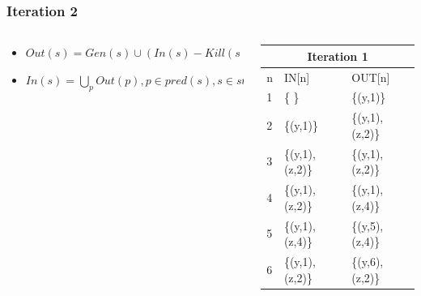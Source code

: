 \begin{frame}[fragile, t]
	\frametitle{Iteration 2} 
	
	\vspace{-1cm}
	
	\begin{columns}[T]
		\begin{column}[T]{.4\textwidth}
	\begin{center}
		\begin{scriptsize}
			\begin{minipage}{8cm}
					\begin{itemize}
						\item $Out(s) = Gen(s) \cup (In(s) - Kill(s))$  
						\item $In(s) = \bigcup_p Out(p), p \in pred(s), s \in stmts$
					\end{itemize}
			\end{minipage}
		\end{scriptsize}
	\end{center}
\end{column}
\begin{column}[T]{.6\textwidth}
	\begin{tiny}
		   \begin{table}[]
		\begin{tabular}{|l|l|l|}
			\hline			
			\multicolumn{3}{|c|}{Iteration 1}\\
			\hline
			n & IN{[}n{]} & OUT{[}n{]} \\ \hline
			1  & \{ \}            & \{(y,1)\} \\ \hline
			2  & \{(y,1)\}        & \{(y,1), (z,2)\} \\ \hline
			3  & \{(y,1), (z,2)\} & \{(y,1), (z,2)\} \\ \hline
			4  & \{(y,1), (z,2)\} & \{(y,1), (z,4)\} \\ \hline
			5  & \{(y,1), (z,4)\} & \{(y,5), (z,4)\} \\ \hline
			6  & \{(y,1), (z,2)\} & \{(y,6), (z,2)\} \\ \hline
		\end{tabular}
	\end{table}   
\end{tiny}
\end{column}
	\end{columns}
	

\end{frame}
